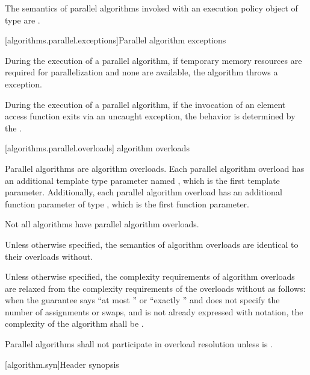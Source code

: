 \pnum
The semantics of parallel algorithms invoked with an execution policy object of
 type
are .

[algorithms.parallel.exceptions]{Parallel algorithm exceptions}

\pnum
During the execution of a parallel algorithm,
if temporary memory resources are required for parallelization
and none are available, the algorithm throws a  exception.

\pnum
During the execution of a parallel algorithm,
if the invocation of an element access function exits via an uncaught exception,
the behavior is determined by the .

[algorithms.parallel.overloads]{ algorithm overloads}

\pnum
Parallel algorithms are algorithm overloads.
Each parallel algorithm overload
has an additional template type parameter named ,
which is the first template parameter.
Additionally, each parallel algorithm overload
has an additional function parameter of type ,
which is the first function parameter.
\begin{note}
Not all algorithms have parallel algorithm overloads.
\end{note}

\pnum
Unless otherwise specified,
the semantics of  algorithm overloads
are identical to their overloads without.

\pnum
Unless otherwise specified,
the complexity requirements of  algorithm overloads
are relaxed from the complexity requirements of the overloads without
as follows:
when the guarantee says ``at most '' or
``exactly ''
and does not specify the number of assignments or swaps, and
 is not already expressed with  \bigoh{} notation,
the complexity of the algorithm shall be .

\pnum
Parallel algorithms shall not participate in overload resolution unless
 is .

[algorithm.syn]{Header  synopsis}
%

